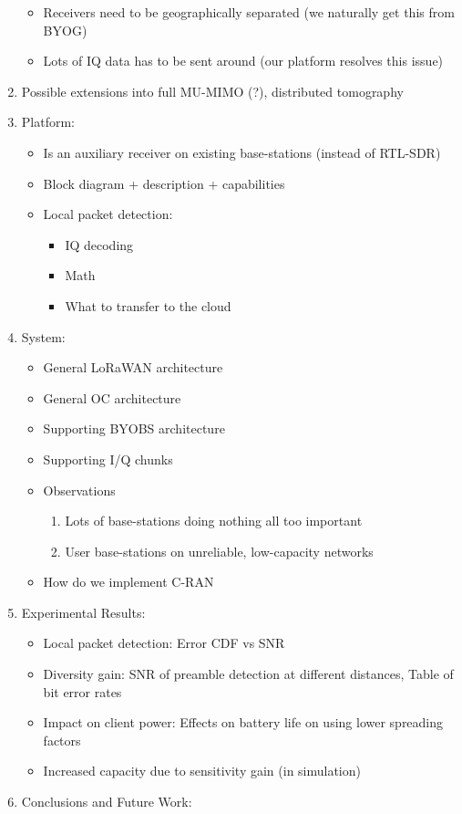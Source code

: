 \begin{enumerate}
            \begin{itemize}
                \item Receivers need to be geographically separated (we naturally get this from BYOG)
                \item Lots of IQ data has to be sent around (our platform resolves this issue)
            \end{itemize}
        \item Possible extensions into full MU-MIMO (?), distributed tomography
    \item Platform:
        \begin{itemize}
            \item Is an auxiliary receiver on existing base-stations (instead of RTL-SDR)
            \item Block diagram + description + capabilities
            \item Local packet detection: 
                \begin{itemize}
                    \item IQ decoding
                    \item Math
                    \item What to transfer to the cloud
                \end{itemize}
        \end{itemize}
    \item System:
        \begin{itemize}
            \item General LoRaWAN architecture
            \item General OC architecture
            \item Supporting BYOBS architecture
            \item Supporting I/Q chunks
            \item Observations
                \begin{enumerate}
                    \item Lots of base-stations doing nothing all too important
                    \item User base-stations on unreliable, low-capacity networks
                \end{enumerate}
            \item How do we implement C-RAN
        \end{itemize}
    \item Experimental Results:
        \begin{itemize}
            \item Local packet detection: Error CDF vs SNR
            \item Diversity gain: SNR of preamble detection at different distances, Table of bit error rates
            \item Impact on client power: Effects on battery life on using lower spreading factors
            \item Increased capacity due to sensitivity gain (in simulation)
        \end{itemize}
    \item Conclusions and Future Work:
\end{enumerate}

